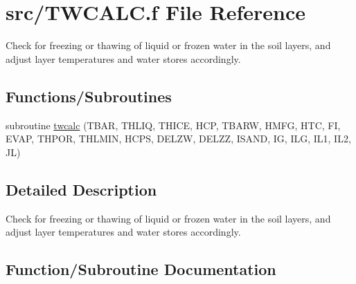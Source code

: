 \hypertarget{TWCALC_8f}{}\section{src/\+T\+W\+C\+A\+L\+C.f File Reference}
\label{TWCALC_8f}


Check for freezing or thawing of liquid or frozen water in the soil layers, and adjust layer temperatures and water stores accordingly.  


\subsection*{Functions/\+Subroutines}
\begin{DoxyCompactItemize}
\item 
subroutine \hyperlink{TWCALC_8f_a70ccee2822c2cc573ae3aca26942288a}{twcalc} (T\+B\+A\+R, T\+H\+L\+I\+Q, T\+H\+I\+C\+E, H\+C\+P, T\+B\+A\+R\+W, H\+M\+F\+G, H\+T\+C, F\+I, E\+V\+A\+P, T\+H\+P\+O\+R, T\+H\+L\+M\+I\+N, H\+C\+P\+S, D\+E\+L\+Z\+W, D\+E\+L\+Z\+Z, I\+S\+A\+N\+D, I\+G, I\+L\+G, I\+L1, I\+L2, J\+L)
\end{DoxyCompactItemize}


\subsection{Detailed Description}
Check for freezing or thawing of liquid or frozen water in the soil layers, and adjust layer temperatures and water stores accordingly. 



\subsection{Function/\+Subroutine Documentation}
\hypertarget{TWCALC_8f_a70ccee2822c2cc573ae3aca26942288a}{}
